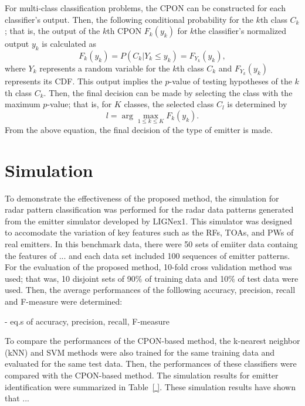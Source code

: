 \documentclass[runningheads,a4paper]{llncs}
\begin{document}
For multi-class classification problems, the CPON can be constructed for each classifier's output. Then, the following conditional probability for
the $k$th class $C_k$; that is, the output of the $k$th CPON $F_k(y_k)$ for $k$the classifier's normalized output $y_k$ is calculated as
\begin{equation}
F_k(y_k) = P(C_k| Y_k\le y_k) = F_{Y_k}(y_k),
\end{equation}
where $Y_k$ represents a random variable for the $k$th class $C_k$ and $F_{Y_k}(y_k)$ represents its CDF.
This output implies the $p$-value of testing hypotheses of the $k$th class $C_k$. 
Then, the final decision can be made by selecting the class with the maximum $p$-value; that is, for $K$ classes, the selected class $C_l$ is
determined by
\begin{equation}
l = \arg \max_{1\le k\le K} F_k(y_k).
\end{equation}
From the above equation, the final decision of the type of emitter is made.



\section{Simulation}

To demonstrate the effectiveness of the proposed method, the simulation for radar pattern classification was performed for the radar data patterns
generated from the emitter simulator developed by LIGNex1. This simulator was designed to accomodate the variation of key features such as
the RFs, TOAs, and PWs of real emitters. In this benchmark data, there were 50 sets of emiiter data containg the features of ... and each data set
included 100 sequences of emitter patterns. For the evaluation of the proposed method, 10-fold cross validation method was used; that was,
10 disjoint sets of 90$\%$ of training data and 10$\%$ of test data were used.  
Then, the average performances of the folllowing accuracy, precision, recall and F-measure were determined:

- eq.s of accuracy, precision, recall, F-measure

\vspace{5em}

To compare the performances of the CPON-based method, the k-nearest neighbor (kNN) and SVM methods were also trained for
the same training data and evaluated for the same test data. Then, the performances of these classifiers were compared with the CPON-based method.
The simulation results for emitter identification were summarized in Table~\ref{ }. These simulation results have shown that ... 
\end{document}

